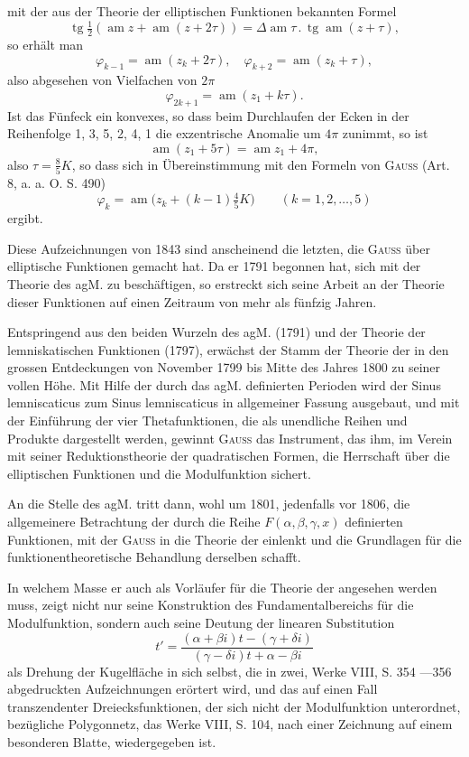 mit der aus der Theorie der elliptischen Funktionen bekannten Formel
\[
\operatorname{tg}\tfrac12(\operatorname{am}z+\operatorname{am}(z+2\tau))
=\Delta\operatorname{am}\tau\mathbin{.}\operatorname{tg}\operatorname{am}(z+\tau),
\]
so erhält man
\[
\varphi_{k-1}=\operatorname{am}(z_k+2\tau),\quad\varphi_{k+2}=\operatorname{am}(z_k+\tau),
\]
also abgesehen von Vielfachen von \(2\pi\)
\[
\varphi_{2k+1}=\operatorname{am}(z_1+k\tau).
\]
Ist das Fünfeck ein konvexes, so dass beim Durchlaufen der Ecken in der
Reihenfolge 1, 3, 5, 2, 4, 1 die exzentrische Anomalie um \(4\pi\) zunimmt, so ist
\[
\operatorname{am}(z_1+5\tau)=\operatorname{am}z_1+4\pi,
\]
also \(\tau=\frac85K\), so dass sich in Übereinstimmung mit den Formeln von \textsc{Gauss}
(Art. 8, a. a. O. S. 490)
\[
\varphi_k=\operatorname{am}\bigl(z_k+(k-1)\tfrac45K\bigr)\qquad(k=1,2,\ldots,5)
\]
ergibt.
\par\clearpage{}
\noindent\hspace*{\parindent}Diese Aufzeichnungen von 1843 sind anscheinend die letzten, die \textsc{Gauss}
über elliptische Funktionen gemacht hat. Da er 1791 begonnen hat, sich
mit der Theorie des agM. zu beschäftigen, so erstreckt sich seine Arbeit an
der Theorie dieser Funktionen auf einen Zeitraum von mehr als fünfzig Jahren.
\par
Entspringend aus den beiden Wurzeln des agM. (1791) und der Theorie
der lemniskatischen Funktionen (1797), erwächst der Stamm der Theorie der\linebreak
{} in den grossen Entdeckungen von November
1799 bis Mitte des Jahres 1800 zu seiner vollen Höhe. Mit Hilfe der durch
das agM. definierten Perioden wird der Sinus lemniscaticus zum Sinus lemniscaticus
in allgemeiner Fassung ausgebaut, und mit der Einführung der vier
Thetafunktionen, die als unendliche Reihen und Produkte dargestellt werden,
gewinnt \textsc{Gauss} das Instrument, das ihm, im Verein mit seiner Reduktionstheorie
der quadratischen Formen, die Herrschaft über die elliptischen Funktionen
und die Modulfunktion sichert.
\par
An die Stelle des agM. tritt dann, wohl um 1801, jedenfalls vor 1806,
die allgemeinere Betrachtung der durch die Reihe \(F(\alpha,\beta,\gamma,x)\) definierten Funktionen,
mit der \textsc{Gauss} in die Theorie der  einlenkt und die Grundlagen für
die funktionentheoretische Behandlung derselben schafft.
\par
In welchem Masse er auch als Vorläufer für die Theorie der  angesehen werden muss, zeigt nicht nur seine Konstruktion
des Fundamentalbereichs für die Modulfunktion, sondern auch seine
Deutung der linearen Substitution
\[
t'=\frac{(\alpha+\beta i)t-(\gamma+\delta i)}{(\gamma-\delta i)t+\alpha-\beta i}
\]
als Drehung der Kugelfläche in sich selbst, die in zwei, Werke VIII, S. 354
—356 abgedruckten Aufzeichnungen erörtert wird, und das auf einen Fall
transzendenter Dreiecksfunktionen, der sich nicht der Modulfunktion unterordnet,
bezügliche Polygonnetz, das Werke VIII, S. 104, nach einer Zeichnung
auf einem besonderen Blatte, wiedergegeben ist.
